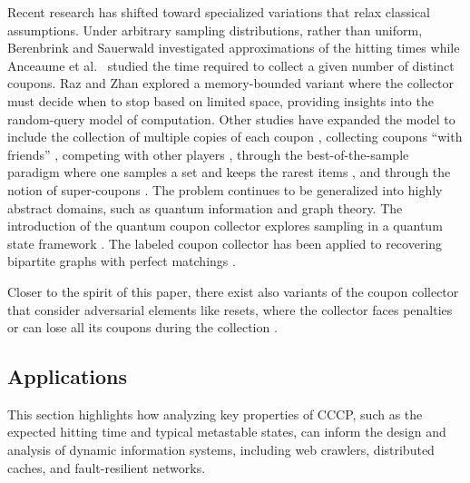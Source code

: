 \documentclass[11pt,a4paper]{article}
\begin{document}
Recent research has shifted toward specialized variations that relax classical assumptions.
Under arbitrary sampling distributions, rather than uniform,
Berenbrink and Sauerwald \cite{berenbrink2009weighted} investigated approximations of the hitting times 
while Anceaume et al.~\cite{anceaume2015new, anceaume2016optimization} studied the time required to collect a given number of distinct coupons.
% 
Raz and Zhan \cite{raz2020random} explored a memory-bounded variant where the collector must decide when to stop based on limited space, providing insights into the random-query model of computation.
% 
Other studies have expanded the model to include the collection of multiple copies of each coupon \cite{adler2003coupon}, collecting coupons ``with friends''  \cite{alistarh2021collecting}, competing with other players \cite{krityakierne2025slowest}, through the best-of-the-sample paradigm where one samples a set and keeps the rarest items \cite{xu2011generalized}, and through the notion of super-coupons \cite{athreya2025generalisation}.
% 
The problem continues to be generalized into highly abstract domains, such as quantum information and graph theory.
The introduction of the quantum coupon collector explores sampling in a quantum state framework \cite{arunachalam2020quantum}.
The labeled coupon collector has been applied to recovering bipartite graphs with perfect matchings \cite{berrebi2025labeled}.

Closer to the spirit of this paper, there exist also variants of the coupon collector that consider adversarial elements like resets, where the collector faces penalties or can lose all its coupons during the collection \cite{todic2023coupon, jockovic2024coupon}.





\subsection{Applications}\label{sec:applications}

This section highlights how analyzing key properties of CCCP, such as the expected hitting time and typical metastable states, can inform the design and analysis of dynamic information systems, including web crawlers, distributed caches, and fault-resilient networks. 
\end{document}
